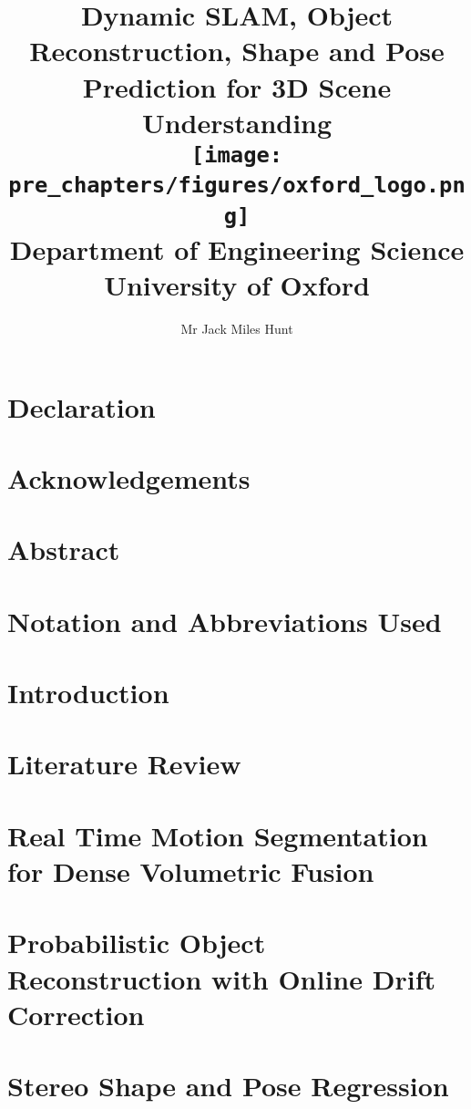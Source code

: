 \documentclass[
  12pt, 
]{book}
\title{
    {Dynamic SLAM, Object Reconstruction, Shape and Pose Prediction for 3D Scene Understanding}\\
    \vspace{10 mm}
    {\texttt{[image: pre\_chapters/figures/oxford\_logo.png]}\\
    {\large Department of Engineering Science\\ University of Oxford}\\}
}
\author{Mr Jack Miles Hunt}
\date{}
\begin{document}
\maketitle

\chapter*{Declaration}


\chapter*{Acknowledgements}


\chapter*{Abstract}


\chapter*{Notation and Abbreviations Used}


\tableofcontents
\listoffigures
\listoftables

\chapter{Introduction}


\chapter{Literature Review}


\chapter{Real Time Motion Segmentation for Dense Volumetric Fusion}


\chapter{Probabilistic Object Reconstruction with Online Drift Correction}


\chapter{Stereo Shape and Pose Regression}

\end{document}
